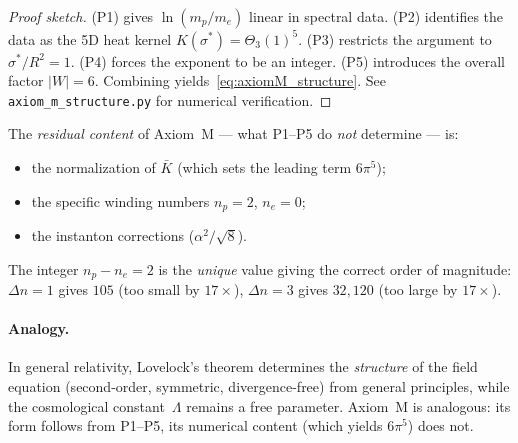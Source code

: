 \begin{proof}[Proof sketch]
(P1) gives $\ln(m_p/m_e)$ linear in spectral data.
(P2) identifies the data as the 5D heat kernel
$K(\sigma^*)=\Theta_3(1)^5$.
(P3) restricts the argument to $\sigma^*/R^2=1$.
(P4) forces the exponent to be an integer.
(P5) introduces the overall factor $|W|=6$.
Combining yields~\eqref{eq:axiomM_structure}.
See \texttt{axiom\_m\_structure.py} for numerical verification.
\end{proof}

The \emph{residual content} of Axiom~M --- what P1--P5 do \emph{not}
determine --- is:
\begin{itemize}[nosep]
\item the normalization of $\bar{K}$ (which sets the leading term $6\pi^5$);
\item the specific winding numbers $n_p=2$, $n_e=0$;
\item the instanton corrections ($\alpha^2/\!\sqrt{8}$).
\end{itemize}
The integer $n_p-n_e=2$ is the \emph{unique} value giving the correct
order of magnitude: $\Delta n=1$ gives $105$ (too small by $17\times$),
$\Delta n=3$ gives $32{,}120$ (too large by $17\times$).

\paragraph{Analogy.}
In general relativity, Lovelock's theorem determines the \emph{structure}
of the field equation (second-order, symmetric, divergence-free) from
general principles, while the cosmological constant~$\Lambda$ remains
a free parameter. Axiom~M is analogous: its form follows from P1--P5,
its numerical content (which yields $6\pi^5$) does not.



